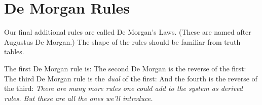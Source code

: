 \section{De Morgan Rules}
Our final additional rules are called De Morgan's Laws. (These are named after Augustus De Morgan.) The shape of the rules should be familiar from truth tables.

The first De Morgan rule is:
The second De Morgan is the reverse of the first:
The third De Morgan rule is the \emph{dual} of the first:
And the fourth is the reverse of the third:
\bigskip
\emph{There are many more rules one could add to the system as derived rules. But these are all the ones we'll introduce.}

